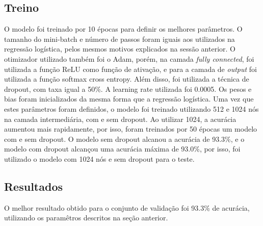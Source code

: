 \documentclass[conference]{IEEEtran}
\begin{document}
\subsection{Treino}
O modelo foi treinado por 10 épocas para definir os melhores parâmetros. O tamanho do mini-batch e número de passos foram iguais aos utilizados na regressão logística, pelos mesmos motivos explicados na sessão anterior. O otimizador utilizado também foi o Adam, porém, na camada \textit{fully connected}, foi utilizada a função ReLU como função de ativação, e para a camada de \textit{output} foi utilizada a função softmax cross entropy. Além disso, foi utilizada a técnica de dropout, com taxa igual a 50\%. A learning rate utilizada foi 0.0005. Os pesos e bias foram inicializados da mesma forma que a regressão logística. Uma vez que estes parâmetros foram definidos, o modelo foi treinado utilizando 512 e 1024 nós na camada intermediária, com e sem dropout. Ao utilizar 1024, a acurácia aumentou mais rapidamente, por isso, foram treinados por 50 épocas um modelo com e sem dropout. O modelo sem dropout alcanou a acurácia de 93.3\%, e o modelo com dropout alcançou uma acurácia máxima de 93.0\%, por isso, foi utilizado o modelo com 1024 nós e sem dropout para o teste.

\subsection{Resultados}
O melhor resultado obtido para o conjunto de validação foi 93.3\% de acurácia, utilizando os paramêtros descritos na seção anterior.
\end{document}
